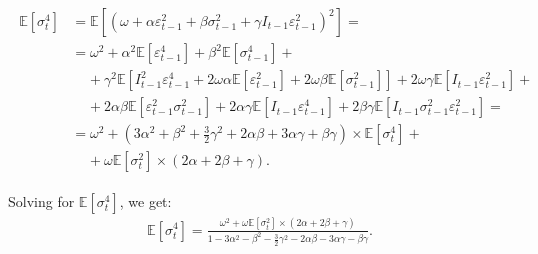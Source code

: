 \documentclass[authoryear, 1p]{elsarticle}
\numberwithin{equation}{section}
\begin{document}
\begin{pot}
\begin{align} \label{eq:r9}
\begin{split}
\mathbb{E}\left[\sigma^{4}_{t}\right] & =\mathbb{E}\left[\left(\omega + \alpha \varepsilon^{2}_{t-1}+\beta \sigma^{2}_{t-1}+\gamma I_{t-1} \varepsilon^{2}_{t-1}\right)^2\right]= \\
& = \omega^2 + \alpha ^ 2 \mathbb{E}\left[\varepsilon_{t-1} ^ 4\right] + \beta ^ 2 \mathbb{E}\left[\sigma^{4}_{t - 1}\right] + \\
& \;\;\;\; + \gamma ^ 2 \mathbb{E}\left[I^{2}_{t-1}\varepsilon^{4}_{t-1}+2\omega\alpha \mathbb{E}\left[\varepsilon^{2}_{t-1}\right] + 2\omega\beta \mathbb{E}\left[\sigma^{2}_{t-1}\right]\right] + 2\omega\gamma \mathbb{E}\left[I_{t-1} \varepsilon^{2}_{t-1}\right] + \\
& \;\;\;\; + 2\alpha\beta \mathbb{E}\left[\varepsilon^{2}_{t-1}\sigma^{2}_{t-1}\right]+ 2\alpha\gamma \mathbb{E}\left[I_{t-1}\varepsilon^{4}_{t-1}\right] + 2\beta\gamma \mathbb{E}\left[I_{t-1} \sigma^{2}_{t-1} \varepsilon^{2}_{t-1}\right] = \\
& =\omega^2+\left(3\alpha ^ 2 + \beta^2 + \frac{3}{2}\gamma ^ 2 + 2\alpha\beta + 3\alpha\gamma +\beta\gamma\right) \times \mathbb{E}\left[\sigma_{t}^4\right] + \\  & \;\;\;\; + \omega \mathbb{E}\left[\sigma^2_{t}\right] \times \left(2\alpha + 2\beta + \gamma\right).
\end{split}
\end{align}

Solving for $\mathbb{E}\left[\sigma_{t}^4\right]$, we get:
\begin{align}\label{eq:r10}
\mathbb{E}\left[\sigma_{t}^4\right] = \frac{\omega^2 + \omega \mathbb{E}\left[\sigma^2_{t}\right] \times (2\alpha + 2\beta + \gamma)}{1 - 3\alpha ^ 2 - \beta^2 - \frac{3}{2}\gamma ^ 2 - 2\alpha\beta - 3\alpha\gamma - \beta\gamma}.
\end{align}


\end{pot}
\end{document}
